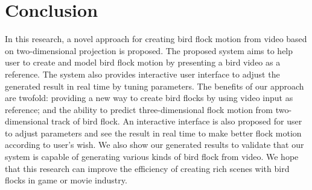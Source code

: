\chapter{Conclusion}


In this research, a novel approach for creating bird flock motion from video based on two-dimensional projection is proposed. The proposed system aims to help user to create and model bird flock motion by presenting a bird video as a reference. The system also provides interactive user interface to adjust the generated result in real time by tuning parameters. The benefits of our approach are twofold: providing a new way to create bird flocks by using video input as reference; and the ability to predict three-dimensional flock motion from two-dimensional track of bird flock. An interactive interface is also proposed for user to adjust parameters and see the result in real time to make better flock motion according to user's wish. We also show our generated results to validate that our system  is capable of generating various kinds of bird flock from video. We hope that this research can improve the efficiency of creating rich scenes with bird flocks in game or movie industry.